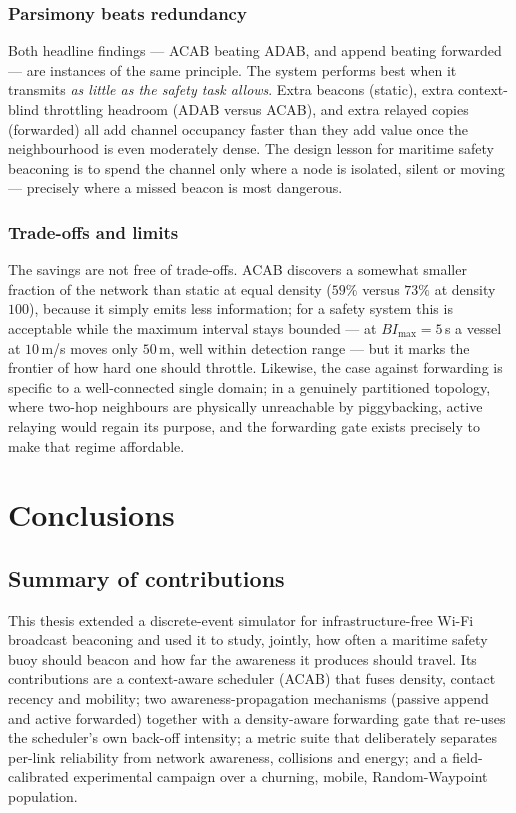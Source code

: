 \documentclass[12pt,a4paper,oneside]{report}
\newcommand{\bimax}{BI_{\max}}
\begin{document}
\subsection{Parsimony beats redundancy}
Both headline findings --- ACAB beating ADAB, and append beating forwarded ---
are instances of the same principle. The system performs best when it transmits
\emph{as little as the safety task allows}. Extra beacons (static), extra
context-blind throttling headroom (ADAB versus ACAB), and extra relayed copies
(forwarded) all add channel occupancy faster than they add value once the
neighbourhood is even moderately dense. The design lesson for maritime safety
beaconing is to spend the channel only where a node is isolated, silent or
moving --- precisely where a missed beacon is most dangerous.

\subsection{Trade-offs and limits}
The savings are not free of trade-offs. ACAB discovers a somewhat smaller
fraction of the network than static at equal density ($59\%$ versus $73\%$ at
density $100$), because it simply emits less information; for a safety system
this is acceptable while the maximum interval stays bounded --- at $\bimax=5$\,s a
vessel at $10$\,m/s moves only $50$\,m, well within detection range --- but it
marks the frontier of how hard one should throttle. Likewise, the case against
forwarding is specific to a well-connected single domain; in a genuinely
partitioned topology, where two-hop neighbours are physically unreachable by
piggybacking, active relaying would regain its purpose, and the forwarding gate
exists precisely to make that regime affordable.

\chapter{Conclusions}
\label{ch:conclusions}

\section{Summary of contributions}
This thesis extended a discrete-event simulator for infrastructure-free Wi-Fi
broadcast beaconing and used it to study, jointly, how often a maritime safety
buoy should beacon and how far the awareness it produces should travel. Its
contributions are a context-aware scheduler (ACAB) that fuses density, contact
recency and mobility; two awareness-propagation mechanisms (passive append and
active forwarded) together with a density-aware forwarding gate that re-uses the
scheduler's own back-off intensity; a metric suite that deliberately separates
per-link reliability from network awareness, collisions and energy; and a
field-calibrated experimental campaign over a churning, mobile, Random-Waypoint
population.
\end{document}

